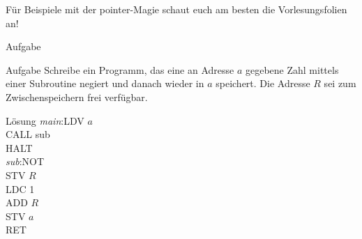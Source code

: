 \begin{frame}
	Für Beispiele mit der pointer-Magie schaut euch am besten die Vorlesungsfolien an!
\end{frame}

\begin{frame}{Aufgabe}
	\begin{exampleblock}{Aufgabe}
		Schreibe ein Programm, das eine an Adresse $a$ gegebene Zahl mittels einer Subroutine negiert und danach wieder in $a$ speichert. Die Adresse $R$ sei zum Zwischenspeichern frei verfügbar.
	\end{exampleblock}
\end{frame}

\begin{frame}
	\begin{block}{Lösung}
		\emph{main}:LDV $a$\\
		CALL sub\\	
		HALT\\
		\emph{sub}:NOT\\
		STV $R$\\
		LDC 1\\
		ADD $R$\\
		STV $a$\\
		RET
	\end{block}
\end{frame}
